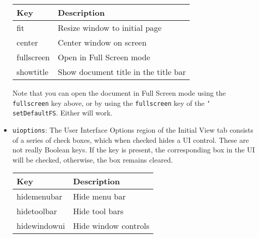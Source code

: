 \documentclass{article}
\newcommand{\cs}[1]{\texttt{\char`\\#1}}
\begin{document}
\begin{itemize}
    \begin{tabular}{|>{\ttfamily}lp{2in}|}\hline
    Key         & Description \\\hline
    fit         & Resize window to initial page\\
    center      & Center window on screen \\
    fullscreen  & Open in Full Screen mode\\
    showtitle   & Show document title in the title bar\\\hline
    \end{tabular}

    Note that you can open the document in Full Screen mode using the
    \texttt{fullscreen} key above, or by using the \texttt{fullscreen} key
    of the \cs{setDefaultFS}. Either will work.

\newpage

    \item \texttt{uioptions}: The User Interface Options region of
    the Initial View tab consists of a series of check boxes, which
    when checked hides a UI control. These are not really Boolean
    keys. If the key is present, the corresponding box in the UI
    will be checked, otherwise, the box remains cleared.

        \begin{tabular}{|>{\ttfamily}lp{2in}|}\hline
    Key             & Description \\\hline
    hidemenubar     & Hide menu bar\\
    hidetoolbar     & Hide tool bars\\
    hidewindowui    & Hide window controls\\\hline
    \end{tabular}

\end{itemize}
\end{document}
